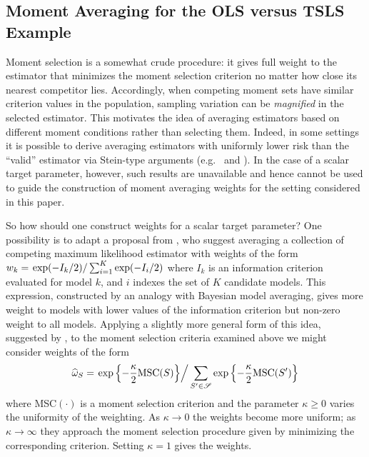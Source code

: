 \subsection{Moment Averaging for the OLS versus TSLS Example}
\label{sec:momentavgexample}
Moment selection is a somewhat crude procedure: it gives full weight to the estimator that minimizes the moment selection criterion no matter how close its nearest competitor lies. 
Accordingly, when competing moment sets have similar criterion values in the population, sampling variation can be \emph{magnified} in the selected estimator.
This motivates the idea of averaging estimators based on different moment conditions rather than selecting them.
Indeed, in some settings it is possible to derive averaging estimators with uniformly lower risk than the ``valid'' estimator via Stein-type arguments (e.g.\ \cite{Hansen2014} and \cite{ChengLiaoShi}).
In the case of a scalar target parameter, however, such results are unavailable and hence cannot be used to guide the construction of moment averaging weights for the setting considered in this paper.

So how should one construct weights for a scalar target parameter?
One possibility is to adapt a proposal from \cite{Burnhametal}, who suggest averaging a collection of competing maximum likelihood estimator with weights of the form 
$w_k =\left. \exp(-I_k/2)\right/\sum_{i=1}^K \exp(-I_i/2)$
where $I_k$ is an information criterion evaluated for model $k$, and $i$ indexes the set of $K$ candidate models. 
This expression, constructed by an analogy with Bayesian model averaging, gives more weight to models with lower values of the information criterion but non-zero weight to all models. 
Applying a slightly more general form of this idea, suggested by \cite{ClaeskensHjortbook}, to the moment selection criteria examined above we might consider weights of the form 
\[		\widehat{\omega}_S = \left.\exp\left\{-\frac{\kappa}{2} \mbox{MSC}(S)\right\}\right/\sum_{S' \in \mathscr{S}}\exp\left\{-\frac{\kappa}{2} \mbox{MSC}(S')\right\}\]
where MSC$(\cdot)$ is a moment selection criterion and the parameter $\kappa \geq 0$ varies the uniformity of the weighting. 
As $\kappa \rightarrow 0$ the weights become more uniform; as $\kappa \rightarrow \infty$ they approach the moment selection procedure given by minimizing the corresponding criterion. 
Setting $\kappa = 1$ gives the \cite{Burnhametal} weights.

